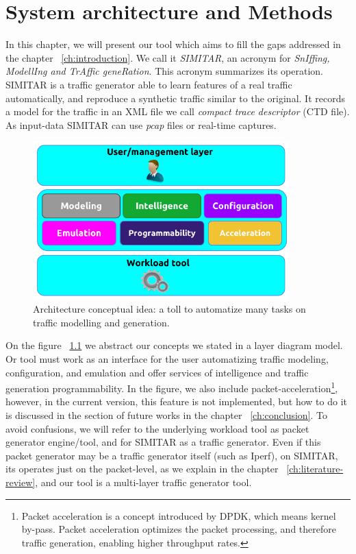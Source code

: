 \chapter{System architecture and Methods}\label{ch:architecture}


In this chapter, we will present our tool which aims to fill the gaps addressed in the chapter ~\ref{ch:introduction}. We call it \textit{SIMITAR}, an acronym for \textit{SnIffing, ModellIng and TrAffic geneRation}.  This acronym summarizes its operation. SIMITAR is a traffic generator able to learn features of a real traffic automatically, and reproduce a synthetic traffic similar to the original. It records a model for the traffic in an XML file we call \textit{compact trace descriptor} (CTD file). As input-data SIMITAR can use \textit{pcap} files or real-time captures.  


\begin{figure}[ht!]
	\centering
	\includegraphics[height=2.4in]{figures/ch1/layer-diagram}
	\caption{ Architecture conceptual idea: a toll to automatize many tasks on traffic modelling and generation.}
	\label{fig:layer-diagram}
\end{figure}

On the figure ~\ref{fig:layer-diagram} we abstract our concepts we stated in a layer diagram model. Or tool must work as an interface for the user automatizing traffic modeling, configuration, and emulation and offer services of intelligence and traffic generation programmability. In the figure, we also include packet-acceleration\footnote{Packet acceleration is a concept introduced by DPDK\cite{web-dpdk}, which means kernel by-pass. Packet acceleration optimizes the packet processing, and therefore traffic generation, enabling higher throughput rates.}, however, in the current version, this feature is not implemented, but how to do it is discussed in the section of future works in the chapter ~\ref{ch:conclusion}. To avoid confusions, we will refer to the underlying workload tool as packet generator engine/tool, and for SIMITAR as a traffic generator. Even if this packet generator may be a traffic generator itself (such as Iperf), on SIMITAR, its operates just on the packet-level, as we explain in the chapter ~\ref{ch:literature-review}, and our tool is a multi-layer traffic generator tool.


